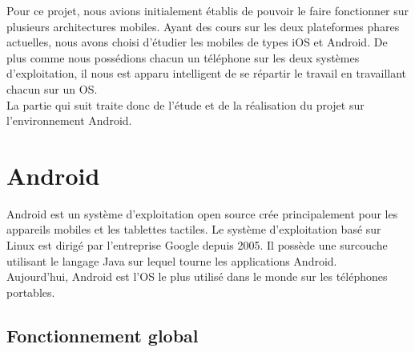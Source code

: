 \newpage

Pour ce projet, nous avions initialement établis de pouvoir le faire fonctionner sur plusieurs 
architectures mobiles. Ayant des cours sur les deux plateformes phares actuelles, nous avons choisi
d'étudier les mobiles de types iOS et Android. De plus comme nous possédions chacun un téléphone 
sur les deux systèmes d'exploitation, il nous est apparu intelligent de se répartir le travail en 
travaillant chacun sur un OS.
\\
La partie qui suit traite donc de l'étude et de la réalisation du projet sur l'environnement Android.



\section{Android}



Android est un système d'exploitation open source crée principalement pour les appareils mobiles et 
les tablettes tactiles. Le système d'exploitation basé sur Linux est dirigé par l'entreprise Google
depuis 2005. Il possède une surcouche utilisant le langage Java sur lequel tourne les applications 
Android.
\\
Aujourd'hui, Android est l'OS le plus utilisé dans le monde sur les téléphones portables.



\subsection{Fonctionnement global}



